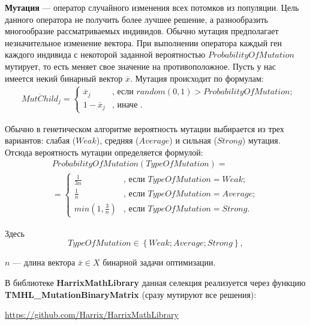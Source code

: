 \documentclass[a4paper,12pt]{article}
\begin{document}
\textbf{Мутация} --- оператор случайного изменения всех потомков из популяции. Цель данного оператора  не получить более лучшее решение, а разнообразить многообразие рассматриваемых индивидов. Обычно мутация предполагает незначительное изменение вектора. При выполнении оператора каждый ген каждого индивида с некоторой заданной вероятностью  $ ProbabilityOfMutation $ мутирует, то есть меняет свое значение на противоположное. Пусть у нас имеется некий бинарный вектор $ \overline{x} $.  Мутация происходит по формулам:
\begin{align}
\label{SetOfOperatorsAlgorithms:eq:Mutation}
&\overline{MutChild}_j=\left\lbrace \begin{aligned}
\overline{x}_j&\text{, если } random \left(0, 1 \right)>ProbabilityOfMutation; \\
1-\overline{x}_j&\text{, иначе }.
\end{aligned}\right.
\end{align}

Обычно в генетическом алгоритме вероятность мутации выбирается из трех вариантов: слабая ($ Weak $), средняя ($ Average $) и сильная ($ Strong $) мутация.
Отсюда вероятность мутации определяется формулой:
\begin{align}
\label{SetOfOperatorsAlgorithms:eq:ProbabilityOfMutation}
ProbabilityOfMutation\left( TypeOfMutation\right) =\\ =\left\lbrace \begin{aligned}
\frac{1}{3n}&\text{, если }TypeOfMutation=Weak; \\ \frac{1}{n}&\text{, если }TypeOfMutation=Average; \\ min\left(1, \frac{3}{n}\right) &\text{, если }TypeOfMutation=Strong.
\end{aligned}\right.\nonumber
\end{align}

Здесь
\begin{equation}
\label{SetOfOperatorsAlgorithms:eq:TypeOfMutation}
TypeOfMutation \in \left\lbrace Weak; Average;Strong\right\rbrace ,
\end{equation}

$ n $ --- длина вектора $ \bar{x}\in X $ бинарной задачи оптимизации.

В библиотеке \textbf{HarrixMathLibrary} данная селекция реализуется через функцию \textbf{TMHL\_MutationBinaryMatrix} (сразу мутируют все решения):

\href{https://github.com/Harrix/HarrixMathLibrary}{https://github.com/Harrix/HarrixMathLibrary}


\newpage
\end{document}
